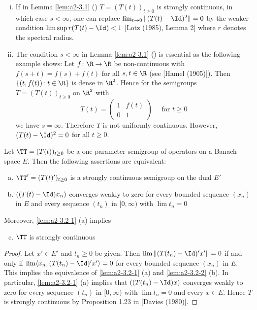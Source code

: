 \begin{remarks*}\label{rem:a2-3.1-kgk}
\begin{enumerate}[(i)]
\item \label{rem:a2-3.1-kgk-1}
If in Lemma \ref{lem:a2-3.1} () 
$T = (T(t))_{t \geq 0}$ is strongly continuous, in which case 
$s < \infty$, one can replace 
$\lim_{t \to 0} \|(T(t) - \Id)^2\| = 0$ by the weaker condition $\lim \sup r(T(t) - \Id) < 1$ [Lotz (1985), Lemma 2] where $r$ denotes the spectral radius.
\item \label{rem:a2-3.1-kgk-2}
The condition $s < \infty$ in Lemma \ref{lem:a2-3.1} () 
is essential as the following example shows:
Let $f \colon \R \to \R$ be non-continuous with $f(s+t) = f(s) + f(t)$ for all $s, t \in \R$ (see [Hamel (1905)]).
Then $\{(t,f(t)) \colon t \in \R\}$ is dense in $\R^2$.
Hence for the semigroups $T = (T(t))_{t \geq 0}$ on $\R^2$ with
\[
T(t) = \left( \begin{array}{cc}
    1 & f(t) \\
    0 & 1
\end{array} \right) \quad  \text{ for } t \geq 0
\]
we have $s = \infty$.
Therefore $T$ is not uniformly continuous.
However, $(T(t) - \Id)^{2} = 0$ for all $t \geq 0$.
\end{enumerate}
\end{remarks*}


\begin{lemma}\label{lem:a2-3.2}
Let $\TT = (T(t))_{t \geq 0}$ be a one-parameter semigroup of operators on a Banach space $E$.
Then the following assertions are equivalent:
\begin{enumerate}[(a)]
\item \label{lem:a2-3.2-1}
$\TT' = (T(t)')_{t \geq 0}$ is a strongly continuous semigroup on the dual $E'$
\item \label{lem:a2-3.2-2}
$((T(t) - \Id)x_n)$ converges weakly to zero for every bounded sequence $(x_n)$ in $E$ and every sequence $(t_n)$ in $[0,\infty)$ with $\lim t_n = 0$
\end{enumerate}
Moreover, \ref{lem:a2-3.2-1} (\lnm a) 
implies
\begin{enumerate}[(a)]
\setcounter{enumi}{2}
\item \label{lem:a2-3.2-3}
$\TT$ is strongly continuous
\end{enumerate}
\end{lemma}

\begin{proof}
Let $x' \in E'$ and $t_n \geq 0$ be given.
Then $\lim \|(T(t_n) - \Id)'x'\| = 0$ if and only if $\lim \langle x_n, (T(t_n) - \Id)'x' \rangle = 0$ for every bounded sequence $(x_n)$ in $E$.
This implies the equivalence of \ref{lem:a2-3.2-1} (\lnm a) and \ref{lem:a2-3.2-2} (\lnm b).
In particular, \ref{lem:a2-3.2-1} (\lnm a) implies that $((T(t_n) - \Id)x)$ converges weakly to zero for every sequence $(t_n)$ in $[0,\infty)$ with $\lim t_n = 0$ and every $x \in E$.
Hence $T$ is strongly continuous by Proposition 1.23 
in [Davies (1980)].
\end{proof}

